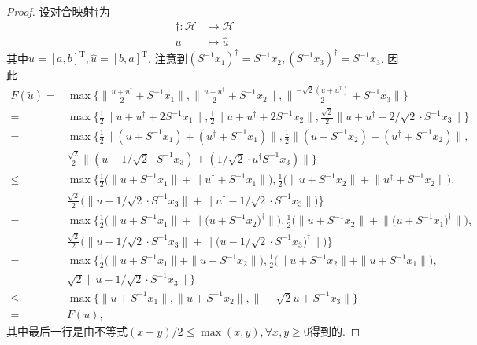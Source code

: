 \documentclass[cn,11pt,a4paper,founder]{elegantpaper}
\newcommand{\calH}{\mathcal{H}}
\DeclareMathOperator{\transpose}{T}
\begin{document}
\begin{proof}
设对合映射\(\dagger\)为
\begin{align*}
\dagger\colon\calH&\to\calH\\
                 u&\mapsto\hat{u}
\end{align*}                 
其中\(u=[a,b]^{\transpose},\hat{u}=[b,a]^{\transpose}\). 注意到\((S^{-1}x_1)^{\dagger}=S^{-1}x_2,(S^{-1}x_3)^{\dagger}=S^{-1}x_3\). 因此
\begin{align*}
F(\tilde{u})=&\max\Bigg\{\bigg\|\frac{u+u^{\dagger}}{2}+S^{-1}x_{1}\bigg\|,\bigg\|\frac{u+u^{\dagger}}{2}+S^{-1}x_{2}\bigg\|,\bigg\|\frac{-\sqrt{2}(u+u^{\dagger})}{2}+S^{-1}x_{3}\bigg\|\Bigg\}\\
=&\max\bigg\{\frac{1}{2}\big\|u+u^{\dagger}+2 S^{-1}x_{1}\big\|,\frac{1}{2}\big\|u+u^{\dagger}+2 S^{-1}x_{2}\big\|,\frac{\sqrt{2}}{2}\big\|u+u^{\dagger}-2/\sqrt{2}\cdot S^{-1}x_{3}\big\|\bigg\}\\
=&\max\bigg\{\frac{1}{2}\big\|(u+S^{-1} x_{1})+(u^{\dagger}+S^{-1}x_{1})\big\|,\frac{1}{2}\big\|(u+S^{-1}x_{2})+(u^{\dagger}+S^{-1}x_{2})\big\|,\\
&\frac{\sqrt{2}}{2}\big\|(u-1/\sqrt{2}\cdot S^{-1}x_{3})+(1/\sqrt{2}\cdot u^{\dagger}S^{-1}x_{3})\big\|\bigg\}\\
\leqslant&\max\bigg\{\frac{1}{2}\big(\big\|u+S^{-1} x_{1}\big\|+\big\|u^{\dagger}+S^{-1}x_{1}\big\|\big),\frac{1}{2}\big(\big\|u+S^{-1} x_{2}\big\|+\big\|u^{\dagger}+S^{-1}x_{2}\big\|\big),\\
&\frac{\sqrt{2}}{2}\big(\big\|u-1/\sqrt{2}\cdot S^{-1}x_{3}\big\|+\big\|u^{\dagger}-1/\sqrt{2}\cdot S^{-1}x_{3}\big\|\big)\bigg\}\\
=&\max\bigg\{\frac{1}{2}\big(\big\|u+S^{-1} x_{1}\big\|+\big\|\big(u+S^{-1}x_{2}\big)^{\dagger}\big\|\big),\frac{1}{2}\big(\big\|u+S^{-1}x_{2}\big\|+\big\|\big(u+S^{-1}x_{1}\big)^{\dagger}\big\|\big),\\
&\frac{\sqrt{2}}{2}\big(\big\|u-1/\sqrt{2}\cdot S^{-1}x_{3}\big\|+\big\|(u-1/\sqrt{2}\cdot S^{-1}x_{3}\big)^{\dagger}\big\|\big)\bigg\}\\
=&\max\bigg\{\frac{1}{2}\big(\|u+S^{-1} x_{1}\|+\|u+S^{-1}x_{2}\|\big),\frac{1}{2}\big(\|u+S^{-1}x_{2}\|+\|u+S^{-1}x_{1}\|\big),\\
&\sqrt{2}\big\|u-1/\sqrt{2}\cdot S^{-1}x_{3}\big\|\bigg\}\\
\leqslant&\max\big\{\big\|u+S^{-1} x_{1}\big\|,\big\|u+S^{-1} x_{2}\big\|,\big\|-\sqrt{2}u+S^{-1}x_{3}\big\|\big\}\\
=&F(u),
\end{align*}
其中最后一行是由不等式\((x+y)/2\leqslant\max(x,y),\forall x,y\geqslant 0\)得到的.


\end{proof}
\end{document}
